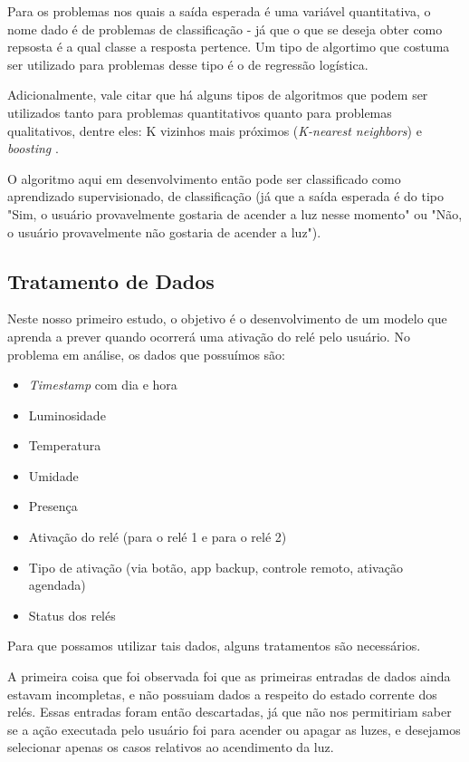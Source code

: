 			Para os problemas nos quais a saída esperada é uma variável quantitativa, o nome dado é de problemas de classificação - já que o que se deseja obter como repsosta é a qual classe a resposta pertence. Um tipo de algortimo que costuma ser utilizado para problemas desse tipo é o de regressão logística.

			Adicionalmente, vale citar que há alguns tipos de algoritmos que podem ser utilizados tanto para problemas quantitativos quanto para problemas qualitativos, dentre eles: K vizinhos mais próximos (\emph{K-nearest neighbors}) e \emph{boosting} \cite{islr}.

			O algoritmo aqui em desenvolvimento então pode ser classificado como aprendizado supervisionado, de classificação (já que a saída esperada é do tipo "Sim, o usuário provavelmente gostaria de acender a luz nesse momento" ou "Não, o usuário provavelmente não gostaria de acender a luz").

		\subsection{Tratamento de Dados}
			
			Neste nosso primeiro estudo, o objetivo é o desenvolvimento de um modelo que aprenda a prever quando ocorrerá uma ativação do relé pelo usuário. No problema em análise, os dados que possuímos são:

			\begin{itemize}
				\item \emph{Timestamp} com dia e hora
				\item Luminosidade
				\item Temperatura
				\item Umidade
				\item Presença
				\item Ativação do relé (para o relé 1 e para o relé 2)
				\item Tipo de ativação (via botão, app backup, controle remoto, ativação agendada)
				\item Status dos relés
			\end{itemize}

			Para que possamos utilizar tais dados, alguns tratamentos são necessários.

			A primeira coisa que foi observada foi que as primeiras entradas de dados ainda estavam incompletas, e não possuiam dados a respeito do estado corrente dos relés. Essas entradas foram então descartadas, já que não nos permitiriam saber se a ação executada pelo usuário foi para acender ou apagar as luzes, e desejamos selecionar apenas os casos relativos ao acendimento da luz.


